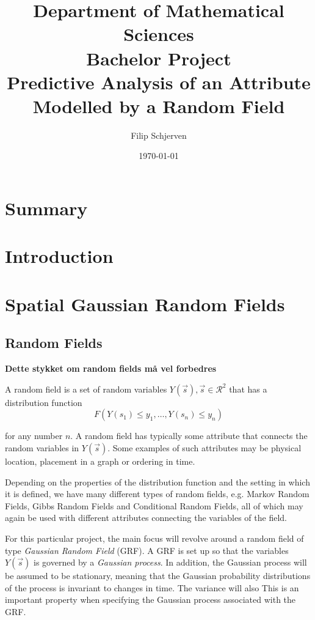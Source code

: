 \documentclass{article}
\title{Department of Mathematical Sciences \\
\vspace{0.5cm}
Bachelor Project \\
\vspace{1cm}
\Huge  Predictive Analysis of an Attribute Modelled by a Random Field %
}
\author{\Large Filip Schjerven}
\date{\Large \today}
\begin{document}
\maketitle
{}

\section*{Summary}


\tableofcontents
\listoffigures
{}
\newpage

\section{Introduction}

\section{Spatial Gaussian Random Fields}
\subsection{Random Fields}
\textbf{Dette stykket om random fields må vel forbedres}

A random field is a set of random variables $Y(\vec{s}), \vec{s} \in \mathcal{R}^2$ that has a distribution function 
\begin{equation} \label{eq:distribution_function}
F(Y(s_1) \leq y_1, \dots , Y(s_n) \leq y_n)
\end{equation} 

for any number $n$. A random field has typically some attribute that connects the random variables in $Y(\vec{s})$. Some examples of such attributes may be physical location, placement in a graph or ordering in time.

Depending on the properties of the distribution function and the setting in which it is defined, we have many different types of random fields, e.g. Markov Random Fields, Gibbs Random Fields and Conditional Random Fields, all of which may again be used with different attributes connecting the variables of the field. 

For this particular project, the main focus will revolve around a random field of type \textit{Gaussian Random Field} (GRF). A GRF is set up so that the variables $Y(\vec{s})$ is governed by a \textit{Gaussian process}. In addition, the Gaussian process will be assumed to be stationary, meaning that the Gaussian probability distributions of the process is invariant to changes in time. The variance will also This is an important property when specifying the Gaussian process associated with the GRF.
\end{document}
